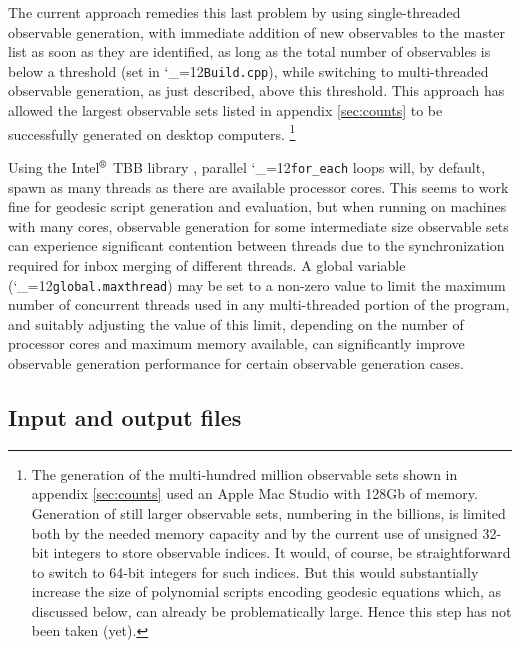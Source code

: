 \documentclass [12pt]{article}
\makeatletter
\renewcommand{\tt}{\begingroup\catcode`_=12\def\_{\string_}\tt@}
\newcommand{\tt@}[1]{\texttt{#1}\endgroup}
\makeatother
\begin{document}
The current approach remedies this last problem by using
single-threaded observable generation, with immediate
addition of new observables to the master list as soon
as they are identified, as long as the total number of
observables is below a threshold (set in \tt{Build.cpp}),
while switching to multi-threaded observable generation,
as just described, above this threshold.
This approach has allowed the largest observable sets listed
in appendix \ref{sec:counts} to be successfully generated
on desktop computers.%
\footnote
    {%
    The generation of the multi-hundred million observable sets
    shown in appendix \ref{sec:counts} used an
    Apple Mac Studio with 128Gb of memory.
    Generation of still larger observable sets,
    numbering in the billions, is limited
    both by the needed memory capacity and by
    the current use of unsigned 32-bit integers
    to store observable indices.
    It would, of course, be straightforward to
    switch to 64-bit integers for such indices.
    But this would substantially increase the size
    of polynomial scripts encoding geodesic equations 
    which, as discussed below,
    can already be problematically large.
    Hence this step has not been taken (yet).
    }

Using the Intel$^{\text{\textregistered}}$ TBB library
\cite{IntelTBB}, parallel \tt{for_each} loops will, by default,
spawn as many threads as there are available processor cores.
This seems to work fine for geodesic script generation
and evaluation, but
when running on machines with many cores,
observable generation
for some intermediate size observable sets
can experience significant contention between
threads due to the synchronization required
for inbox merging of different threads.
A global variable (\tt{global.maxthread})
may be set to a non-zero value to limit
the maximum number of concurrent threads
used in any multi-threaded portion
of the program, and
suitably adjusting the value of this limit,
depending on the number of processor cores and
maximum memory available, can significantly 
improve observable generation performance for certain
observable generation cases.

\subsection{Input and output files}
\end{document}
